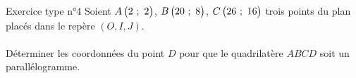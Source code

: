 \documentclass[
    a4paper,
    12pt,
    mathserif,
    handout
    ]{beamer}
\begin{document}
\begin{frame}
	\begin{block}{Exercice type n°4}
	Soient $A\begin{pmatrix}2~;~2\end{pmatrix}$, $B\begin{pmatrix}20~;~8\end{pmatrix}$, $C\begin{pmatrix}26~;~16\end{pmatrix}$ trois points du plan placés dans le repère $(O,I,J)$.\\~\\ Déterminer les coordonnées du point $D$ pour que le quadrilatère $ABCD$ soit un parallélogramme.
	\end{block}
\end{frame}
\end{document}

